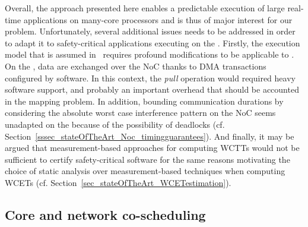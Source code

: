 \documentclass[main.tex]{subfiles}
\begin{document}
Overall, the approach presented here enables a predictable execution of large real-time applications on many-core processors and is thus of major interest for our problem. Unfortunately, several additional issues needs to be addressed in order to adapt it to safety-critical applications executing on the \mppalong. Firstly, the execution model that is assumed in~\cite{PuffitschNP15} requires profound modifications to be applicable to \mppalong. On the \mppalong, data are exchanged over the NoC thanks to DMA transactions configured by software. In this context, the \emph{pull} operation would required heavy software support, and probably an important overhead that should be accounted in the mapping problem. In addition, bounding communication durations by considering the absolute worst case interference pattern on the NoC seems unadapted on the \mppalong because of the possibility of deadlocks (cf. Section~\ref{sssec_stateOfTheArt_Noc_timingguarantees}). And finally, it may be argued that measurement-based approaches for computing WCTTs would not be sufficient to certify safety-critical software for the same reasons motivating the choice of static analysis over measurement-based techniques when computing WCETs (cf. Section~\ref{sec_stateOfTheArt_WCETestimation}).


\subsection{Core and network co-scheduling}
\end{document}
